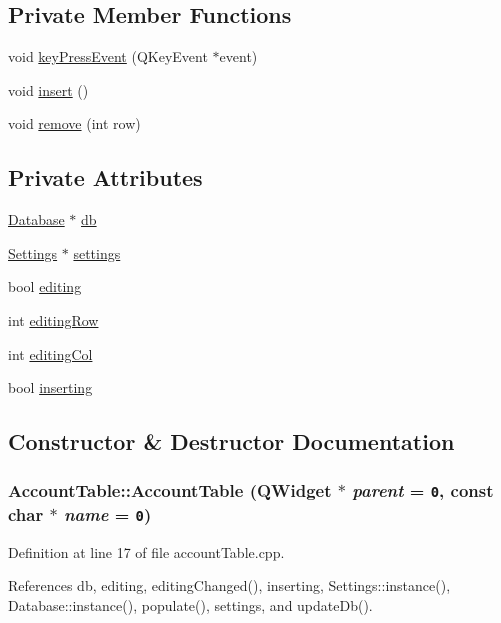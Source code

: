 \subsection*{Private Member Functions}
\begin{CompactItemize}
\item 
void \hyperlink{classAccountTable_d0}{key\-Press\-Event} (QKey\-Event $\ast$event)
\item 
void \hyperlink{classAccountTable_d1}{insert} ()
\item 
void \hyperlink{classAccountTable_d2}{remove} (int row)
\end{CompactItemize}
\subsection*{Private Attributes}
\begin{CompactItemize}
\item 
\hyperlink{classDatabase}{Database} $\ast$ \hyperlink{classAccountTable_r0}{db}
\item 
\hyperlink{classSettings}{Settings} $\ast$ \hyperlink{classAccountTable_r1}{settings}
\item 
bool \hyperlink{classAccountTable_r2}{editing}
\item 
int \hyperlink{classAccountTable_r3}{editing\-Row}
\item 
int \hyperlink{classAccountTable_r4}{editing\-Col}
\item 
bool \hyperlink{classAccountTable_r5}{inserting}
\end{CompactItemize}


\subsection{Constructor \& Destructor Documentation}
\hypertarget{classAccountTable_a0}{
\subsubsection[AccountTable]{\setlength{\rightskip}{0pt plus 5cm}Account\-Table::Account\-Table (QWidget $\ast$ {\em parent} = {\tt 0}, const char $\ast$ {\em name} = {\tt 0})}}
\label{classAccountTable_a0}


Definition at line 17 of file account\-Table.cpp.

References db, editing, editing\-Changed(), inserting, Settings::instance(), Database::instance(), populate(), settings, and update\-Db().


